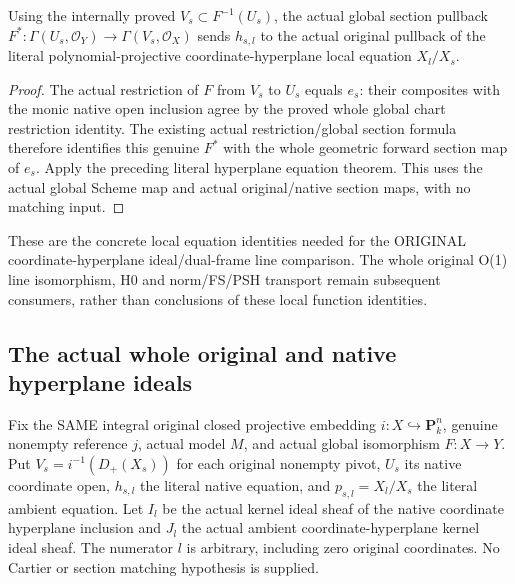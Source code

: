 \begin{theorem}
\label{thm:seven-original-native-hyperplane-global-pullback-route}
\leanok
{}
Using the internally proved $V_s\subset F^{-1}(U_s)$, the actual global
section pullback $F^*: \Gamma(U_s,\mathcal O_Y)\to\Gamma(V_s,\mathcal O_X)$
sends $h_{s,l}$ to the actual original pullback of the literal
polynomial-projective coordinate-hyperplane local equation $X_l/X_s$.
\end{theorem}
\begin{proof}
The actual restriction of $F$ from $V_s$ to $U_s$ equals $e_s$: their
composites with the monic native open inclusion agree by the proved whole
global chart restriction identity. The existing actual restriction/global
section formula therefore identifies this genuine $F^*$ with the whole
geometric forward section map of $e_s$. Apply the preceding literal
hyperplane equation theorem. This uses the actual global Scheme map and
actual original/native section maps, with no matching input.
\end{proof}

These are the concrete local equation identities needed for the ORIGINAL
coordinate-hyperplane ideal/dual-frame line comparison. The whole original
O(1) line isomorphism, H0 and norm/FS/PSH transport remain subsequent
consumers, rather than conclusions of these local function identities.
\subsection{The actual whole original and native hyperplane ideals}
Fix the SAME integral original closed projective embedding $i:X\hookrightarrow
\mathbf P^n_k$, genuine nonempty reference $j$, actual model $M$, and
actual global isomorphism $F:X\to Y$. Put $V_s=i^{-1}(D_+(X_s))$ for each
original nonempty pivot, $U_s$ its native coordinate open, $h_{s,l}$ the
literal native equation, and $p_{s,l}=X_l/X_s$ the literal ambient equation.
Let $I_l$ be the actual kernel ideal sheaf of the native coordinate
hyperplane inclusion and $J_l$ the actual ambient coordinate-hyperplane
kernel ideal sheaf. The numerator $l$ is arbitrary, including zero original
coordinates. No Cartier or section matching hypothesis is supplied.


